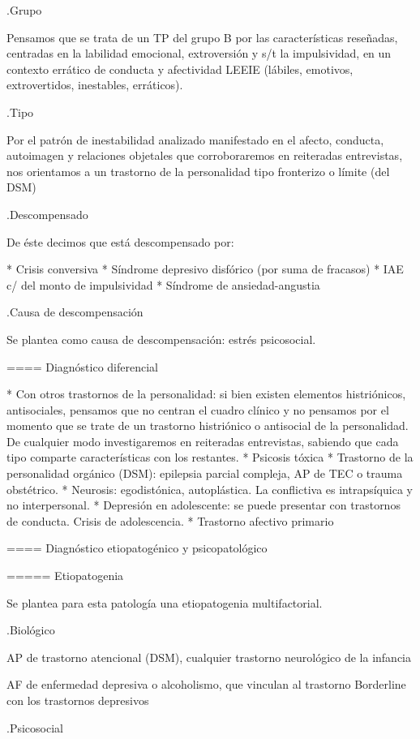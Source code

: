 .Grupo

Pensamos que se trata de un TP del grupo B por las características reseñadas, centradas en la labilidad emocional, extroversión y s/t la impulsividad, en un contexto errático de conducta y afectividad LEEIE (lábiles, emotivos, extrovertidos, inestables, erráticos).

.Tipo

Por el patrón de inestabilidad analizado manifestado en el afecto, conducta, autoimagen y relaciones objetales que corroboraremos en reiteradas entrevistas, nos orientamos a un trastorno de la personalidad tipo fronterizo o límite (del DSM)

.Descompensado

De éste decimos que está descompensado por:

* Crisis conversiva
* Síndrome depresivo disfórico (por suma de fracasos)
* IAE c/ del monto de impulsividad
* Síndrome de ansiedad-angustia

.Causa de descompensación

Se plantea como causa de descompensación: estrés psicosocial.

==== Diagnóstico diferencial

* Con otros trastornos de la personalidad: si bien existen elementos histriónicos, antisociales, pensamos que no centran el cuadro clínico y no pensamos por el momento que se trate de un trastorno histriónico o antisocial de la personalidad. De cualquier modo investigaremos en reiteradas entrevistas, sabiendo que cada tipo comparte características con los restantes.
* Psicosis tóxica
* Trastorno de la personalidad orgánico (DSM): epilepsia parcial compleja, AP de TEC o trauma obstétrico.
* Neurosis: egodistónica, autoplástica. La conflictiva es intrapsíquica y no interpersonal.
* Depresión en adolescente: se puede presentar con trastornos de conducta. Crisis de adolescencia.
* Trastorno afectivo primario

==== Diagnóstico etiopatogénico y psicopatológico

===== Etiopatogenia

Se plantea para esta patología una etiopatogenia multifactorial.

.Biológico

AP de trastorno atencional (DSM), cualquier trastorno neurológico de la infancia

AF de enfermedad depresiva o alcoholismo, que vinculan al trastorno Borderline con los trastornos depresivos

.Psicosocial

